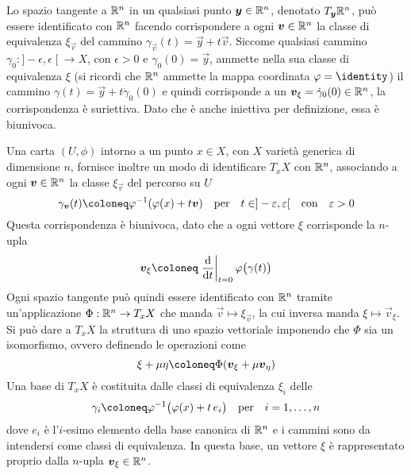 Lo spazio tangente a $\mathbb{R}^{n}$ in un qualsiasi punto $\boldsymbol{y} \in \mathbb{R}^{n}$, denotato $T_{\boldsymbol{y}} \mathbb{R}^{n}$, può essere identificato con $\mathbb{R}^{n}$ facendo corrispondere a ogni $\boldsymbol{v} \in \mathbb{R}^{n}$ la classe di equivalenza $\xi_{\vec{v}}$ del cammino $\gamma_{\vec{v}}(t) = \vec{y} + t\vec{v}$. Siccome qualsiasi cammino $\gamma_0:]-\epsilon,\epsilon\;[\ \to X$, con $\epsilon > 0$ e $\gamma_0(0)=\vec{y}$, ammette nella sua classe di equivalenza $\xi$ (si ricordi che $\mathbb{R}^{n}$ ammette la mappa coordinata $\phi = \identity$) il cammino $\gamma(t) = \vec{y} + t\dot{\gamma}_0(0)$ e quindi corrisponde a un $\boldsymbol{v}_{\xi} = \dot{\gamma}_0(0) \in \mathbb{R}^{n}$, la corrispondenza è suriettiva. Dato che è anche iniettiva per definizione, essa è biunivoca. 

Una carta $(U, \phi)$ intorno a un punto $x \in  X$, con $X$ varietà generica di dimensione $n$, fornisce inoltre un modo di identificare $T_x X$ con $\mathbb{R}^{n}$, associando a ogni $\boldsymbol{v} \in \mathbb{R}^{n}$ la classe $\xi_{\vec{v}}$ del percorso su $U$ \begin{equation} \label{eq:tangentRn}
  \gamma_{\vec{v}}(t) \defeq \phi^{-1}(\phi(x)+t\vec{v}) \qqtext{per} t \in ]-\epsilon, \epsilon[ \qqtext{con} \epsilon > 0
\end{equation} Questa corrispondenza è biunivoca, dato che a ogni vettore $\xi$ corrisponde la $n$-upla \begin{equation} \label{eq:tangentCoords}
\vec{v}_{\xi} \defeq \eval{\dv{t}}_{t=0} \phi\big( \gamma(t)\big)
\end{equation} Ogni spazio tangente può quindi essere identificato con $\mathbb{R}^{n}$ tramite un'applicazione $\Phi: \mathbb{R}^{n} \to T_x X$ che manda $\vec{v} \mapsto \xi_{\vec{v}}$, la cui inversa manda $\xi \mapsto \vec{v}_{\xi}$. Si può dare a $T_x X$ la struttura di uno spazio vettoriale imponendo che $\Phi$ sia un isomorfismo, ovvero definendo le operazioni come
\begin{equation}
\xi + \mu \eta \defeq \Phi(\vec{v}_\xi + \mu \vec{v}_{\eta})
\end{equation}
Una base di $T_x X$ è costituita dalle classi di equivalenza $\xi_i$ delle  \begin{equation} \label{eq:tangentRnBase}
  \gamma_i \defeq \phi^{-1}\big(\phi(x)+t\, e_i\big) \qqtext{per} i=1, \ldots, n
\end{equation}
dove $e_i$ è l'$i$-esimo elemento della base canonica di $\mathbb{R}^{n}$ e i cammini sono da intendersi come classi di equivalenza. In questa base, un vettore $\xi$ è rappresentato proprio dalla $n$-upla $\boldsymbol{v}_{\xi} \in \mathbb{R}^{n}$.


